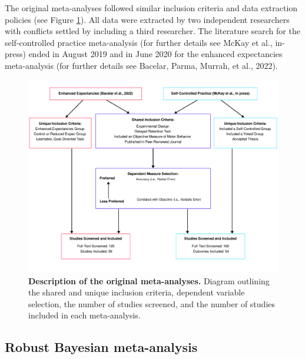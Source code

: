 \documentclass[
  doc, donotrepeattitle,floatsintext]{apa7}
\begin{document}
The original meta-analyses followed similar inclusion criteria and data extraction policies (see Figure \ref{fig:fig1}). All data were extracted by two independent researchers with conflicts settled by including a third researcher. The literature search for the self-controlled practice meta-analysis (for further details see McKay et al., in-press) ended in August 2019 and in June 2020 for the enhanced expectancies meta-analysis (for further details see Bacelar, Parma, Murrah, et al., 2022).

\clearpage

\begin{figure}

{\centering \includegraphics{../../figs/fig1} 

}

\caption{\normalfont \footnotesize \textbf{Description of the original meta-analyses.} Diagram outlining the shared and unique inclusion criteria, dependent variable selection, the number of studies screened, and the number of studies included in each meta-analysis.}\label{fig:fig1}
\end{figure}



\clearpage

\normalsize

\hypertarget{robust-bayesian-meta-analysis}{%
\subsection{Robust Bayesian meta-analysis}\label{robust-bayesian-meta-analysis}}
\end{document}
